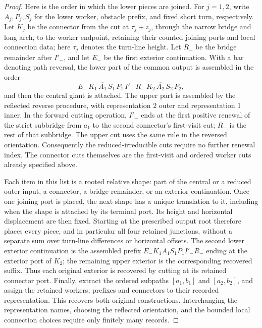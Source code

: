 \begin{proof}
Here is the order in which the lower pieces are joined. For
\(j=1,2\), write \(A_j,P_j,S_j\) for the lower worker, obstacle
prefix, and fixed short turn, respectively. Let \(K_j\) be the
connector from the cut at \(\tau_j+z_j\), through the narrow
bridge and long arch, to the worker endpoint, retaining their counted
joining ports and local connection data; here
\(\tau_j\) denotes the turn-line height. Let \(R_-\) be the
bridge remainder after \(I'_-\), and let \(E_-\) be the first
exterior continuation. With a bar denoting path reversal, the lower
part of the common output is assembled in the order
\[
 E_-\,K_1\,\overline{A_1}\,S_1\,P_1\,I'_-\,R_-\,
 K_2\,\overline{A_2}\,S_2\,P_2,
\]
and then the central giant is attached. The upper part is assembled
by the reflected reverse procedure, with representation 2 outer and
representation 1 inner. In the forward cutting operation,
\(I'_-\) ends at the first positive renewal of the strict subbridge
from \(a_1\) to the second connector's first-visit cut; \(R_-\)
is the rest of that subbridge. The upper cut uses the same rule in
the reversed orientation. Consequently the reduced-irreducible cuts
require no further renewal index. The connector cuts themselves are
the first-visit and ordered worker cuts already specified above.

Each item in this list is a rooted relative shape: part of the central
or a reduced outer input, a connector, a bridge remainder, or an
exterior continuation. Once one joining port is placed, the next shape
has a unique translation to it, including when the shape is attached
by its terminal port. Its height and horizontal displacement are then
fixed. Starting at the prescribed output root therefore places every
piece, and in particular all four retained junctions, without a
separate sum over turn-line differences or horizontal offsets.
The second lower exterior continuation is the assembled prefix
\(E_-K_1\overline{A_1}S_1P_1I'_-R_-\) ending at the exterior
port of \(K_2\);
the remaining upper exterior is the corresponding recovered suffix.
Thus each original exterior is recovered by cutting at its retained
connector port. Finally, extract the ordered subpaths \([a_1,b_1]\) and
\([a_2,b_2]\), and assign the retained workers, prefixes and
connectors to their recorded representation. This recovers both
original constructions. Interchanging the representation names,
choosing the reflected orientation, and the bounded local connection
choices require only finitely many records.


\end{proof}
